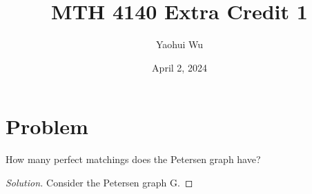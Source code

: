\documentclass[12pt]{article}
\title{MTH 4140 Extra Credit 1}
\author{Yaohui Wu}
\date{April 2, 2024}
\newenvironment*{solution}{\begin{proof}[Solution]}{\end{proof}}
\begin{document}
\maketitle
\section*{Problem}
How many perfect matchings does the Petersen graph have?
\begin{solution}
    Consider the Petersen graph G.
\end{solution}
\end{document}
